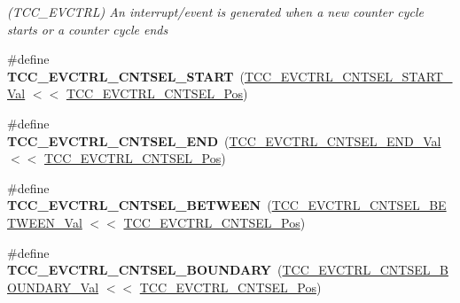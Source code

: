 \begin{DoxyCompactItemize}
\begin{DoxyCompactList}\small\item\em (T\+C\+C\+\_\+\+E\+V\+C\+T\+R\+L) An interrupt/event is generated when a new counter cycle starts or a counter cycle ends \end{DoxyCompactList}\item 
\hypertarget{group___s_a_m_l21___t_c_c_gae3b906e526e4748adc6ec8880d8cb965}{}\#define {\bfseries T\+C\+C\+\_\+\+E\+V\+C\+T\+R\+L\+\_\+\+C\+N\+T\+S\+E\+L\+\_\+\+S\+T\+A\+R\+T}~(\hyperlink{group___s_a_m_l21___t_c_c_ga6b0dbea0f015556a2f82dd810498d8b9}{T\+C\+C\+\_\+\+E\+V\+C\+T\+R\+L\+\_\+\+C\+N\+T\+S\+E\+L\+\_\+\+S\+T\+A\+R\+T\+\_\+\+Val}   $<$$<$ \hyperlink{group___s_a_m_l21___t_c_c_gae74d96924a85770b114b26497558bc10}{T\+C\+C\+\_\+\+E\+V\+C\+T\+R\+L\+\_\+\+C\+N\+T\+S\+E\+L\+\_\+\+Pos})\label{group___s_a_m_l21___t_c_c_gae3b906e526e4748adc6ec8880d8cb965}

\item 
\hypertarget{group___s_a_m_l21___t_c_c_ga0b224c6e8d3b6f5fd9a0143d356af0ca}{}\#define {\bfseries T\+C\+C\+\_\+\+E\+V\+C\+T\+R\+L\+\_\+\+C\+N\+T\+S\+E\+L\+\_\+\+E\+N\+D}~(\hyperlink{group___s_a_m_l21___t_c_c_ga7b614ceff03c6718b96e7e09fbcd6308}{T\+C\+C\+\_\+\+E\+V\+C\+T\+R\+L\+\_\+\+C\+N\+T\+S\+E\+L\+\_\+\+E\+N\+D\+\_\+\+Val}     $<$$<$ \hyperlink{group___s_a_m_l21___t_c_c_gae74d96924a85770b114b26497558bc10}{T\+C\+C\+\_\+\+E\+V\+C\+T\+R\+L\+\_\+\+C\+N\+T\+S\+E\+L\+\_\+\+Pos})\label{group___s_a_m_l21___t_c_c_ga0b224c6e8d3b6f5fd9a0143d356af0ca}

\item 
\hypertarget{group___s_a_m_l21___t_c_c_ga7b21a0843fe0f0a36437d35a513850a5}{}\#define {\bfseries T\+C\+C\+\_\+\+E\+V\+C\+T\+R\+L\+\_\+\+C\+N\+T\+S\+E\+L\+\_\+\+B\+E\+T\+W\+E\+E\+N}~(\hyperlink{group___s_a_m_l21___t_c_c_gacb6b351d27dd1a742733d00d666a5513}{T\+C\+C\+\_\+\+E\+V\+C\+T\+R\+L\+\_\+\+C\+N\+T\+S\+E\+L\+\_\+\+B\+E\+T\+W\+E\+E\+N\+\_\+\+Val} $<$$<$ \hyperlink{group___s_a_m_l21___t_c_c_gae74d96924a85770b114b26497558bc10}{T\+C\+C\+\_\+\+E\+V\+C\+T\+R\+L\+\_\+\+C\+N\+T\+S\+E\+L\+\_\+\+Pos})\label{group___s_a_m_l21___t_c_c_ga7b21a0843fe0f0a36437d35a513850a5}

\item 
\hypertarget{group___s_a_m_l21___t_c_c_gac9fa73e1e244890858a8006f1b0fc4af}{}\#define {\bfseries T\+C\+C\+\_\+\+E\+V\+C\+T\+R\+L\+\_\+\+C\+N\+T\+S\+E\+L\+\_\+\+B\+O\+U\+N\+D\+A\+R\+Y}~(\hyperlink{group___s_a_m_l21___t_c_c_ga1f6a4d6c76708fd01738a1ed7af8d3d2}{T\+C\+C\+\_\+\+E\+V\+C\+T\+R\+L\+\_\+\+C\+N\+T\+S\+E\+L\+\_\+\+B\+O\+U\+N\+D\+A\+R\+Y\+\_\+\+Val} $<$$<$ \hyperlink{group___s_a_m_l21___t_c_c_gae74d96924a85770b114b26497558bc10}{T\+C\+C\+\_\+\+E\+V\+C\+T\+R\+L\+\_\+\+C\+N\+T\+S\+E\+L\+\_\+\+Pos})\label{group___s_a_m_l21___t_c_c_gac9fa73e1e244890858a8006f1b0fc4af}


\end{DoxyCompactItemize}
